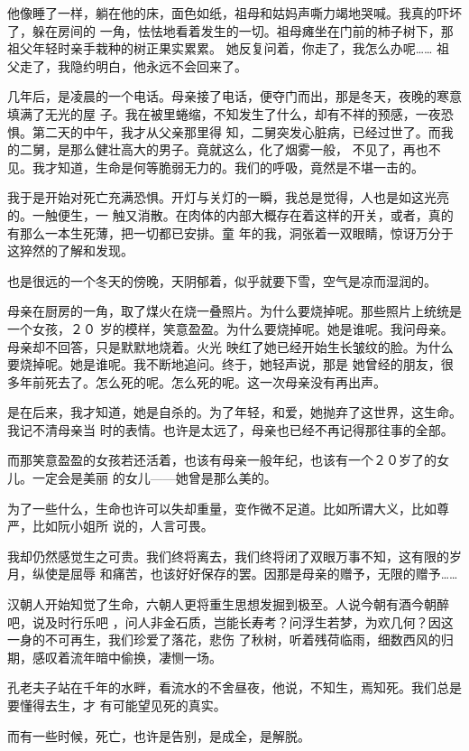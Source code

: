 \documentclass[12pt,a4paper]{article}
\begin{document}
		他像睡了一样，躺在他的床，面色如纸，祖母和姑妈声嘶力竭地哭喊。我真的吓坏了，躲在房间的
	一角，怯怯地看着发生的一切。祖母瘫坐在门前的柿子树下，那祖父年轻时亲手栽种的树正果实累累。
	她反复问着，你走了，我怎么办呢…… 祖父走了，我隐约明白，他永远不会回来了。

		几年后，是凌晨的一个电话。母亲接了电话，便夺门而出，那是冬天，夜晚的寒意填满了无光的屋
	子。我在被里蜷缩，不知发生了什么，却有不祥的预感，一夜恐惧。第二天的中午，我才从父亲那里得
	知，二舅突发心脏病，已经过世了。而我的二舅，是那么健壮高大的男子。竟就这么，化了烟雾一般，
	不见了，再也不见。我才知道，生命是何等脆弱无力的。我们的呼吸，竟然是不堪一击的。

		我于是开始对死亡充满恐惧。开灯与关灯的一瞬，我总是觉得，人也是如这光亮的。一触便生，一
	触又消散。在肉体的内部大概存在着这样的开关，或者，真的有那么一本生死薄，把一切都已安排。童
	年的我，洞张着一双眼睛，惊讶万分于这猝然的了解和发现。

		也是很远的一个冬天的傍晚，天阴郁着，似乎就要下雪，空气是凉而湿润的。

		母亲在厨房的一角，取了煤火在烧一叠照片。为什么要烧掉呢。那些照片上统统是一个女孩，２０
	岁的模样，笑意盈盈。为什么要烧掉呢。她是谁呢。我问母亲。母亲却不回答，只是默默地烧着。火光
	映红了她已经开始生长皱纹的脸。为什么要烧掉呢。她是谁呢。我不断地追问。终于，她轻声说，那是
	她曾经的朋友，很多年前死去了。怎么死的呢。怎么死的呢。这一次母亲没有再出声。

		是在后来，我才知道，她是自杀的。为了年轻，和爱，她抛弃了这世界，这生命。我记不清母亲当
	时的表情。也许是太远了，母亲也已经不再记得那往事的全部。

		而那笑意盈盈的女孩若还活着，也该有母亲一般年纪，也该有一个２０岁了的女儿。一定会是美丽
	的女儿——她曾是那么美的。

		为了一些什么，生命也许可以失却重量，变作微不足道。比如所谓大义，比如尊严，比如阮小姐所
	说的，人言可畏。

		我却仍然感觉生之可贵。我们终将离去，我们终将闭了双眼万事不知，这有限的岁月，纵使是屈辱
	和痛苦，也该好好保存的罢。因那是母亲的赠予，无限的赠予……

		汉朝人开始知觉了生命，六朝人更将重生思想发掘到极至。人说今朝有酒今朝醉吧，说及时行乐吧
	，问人非金石质，岂能长寿考？问浮生若梦，为欢几何？因这一身的不可再生，我们珍爱了落花，悲伤
	了秋树，听着残荷临雨，细数西风的归期，感叹着流年暗中偷换，凄恻一场。

		孔老夫子站在千年的水畔，看流水的不舍昼夜，他说，不知生，焉知死。我们总是要懂得去生，才
	有可能望见死的真实。

		而有一些时候，死亡，也许是告别，是成全，是解脱。
\end{document}
